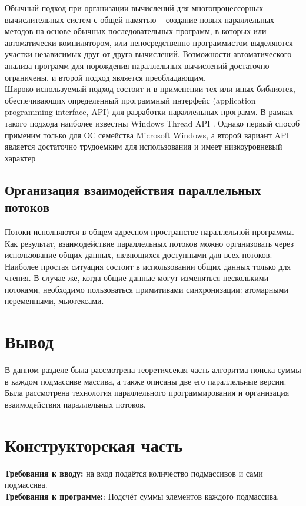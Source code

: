\documentclass[12pt,a4paper]{article}
\numberwithin{equation}{section}
\begin{document}
Обычный подход при организации вычислений для многопроцессорных вычислительных систем с общей памятью – создание новых параллельных методов на основе обычных
последовательных программ, в которых или автоматически компилятором, или непосредственно программистом выделяются участки независимых друг от друга вычислений. Возможности автоматического анализа программ для порождения параллельных вычислений достаточно ограничены, и второй подход является преобладающим.\\

Широко используемый подход состоит и в применении тех или иных библиотек, обеспечивающих определенный программный интерфейс (application programming interface,
API) для разработки параллельных программ. В рамках такого подхода наиболее известны Windows Thread API \cite{litlink1}. Однако первый способ применим только для ОС семейства
Microsoft Windows, а второй вариант API является достаточно трудоемким для использования и имеет низкоуровневый характер

\subsection {Организация взаимодействия параллельных потоков}
Потоки исполняются в общем адресном пространстве параллельной программы. Как результат, взаимодействие параллельных потоков можно организовать через использование общих данных, являющихся доступными для всех потоков. Наиболее простая ситуация состоит в использовании общих данных только для чтения. В случае же, когда общие данные могут изменяться несколькими потоками, необходимо пользоваться примитивами синхронизации: атомарными переменными, мьютексами.

\section*{Вывод}
В данном разделе была рассмотрена теоретичсекая часть алгоритма поиска суммы в каждом подмассиве массива, а также описаны две его параллельные версии. Была рассмотрена технология параллельного программирования и организация взаимодействия параллельных потоков.
\clearpage

\section{Конструкторская часть}
\textbf{Требования к вводу:} на вход подаётся количество подмассивов и сами подмассива.\\
\textbf{Требования к программе:}: Подсчёт суммы элементов каждого подмассива.
\clearpage
\end{document}
